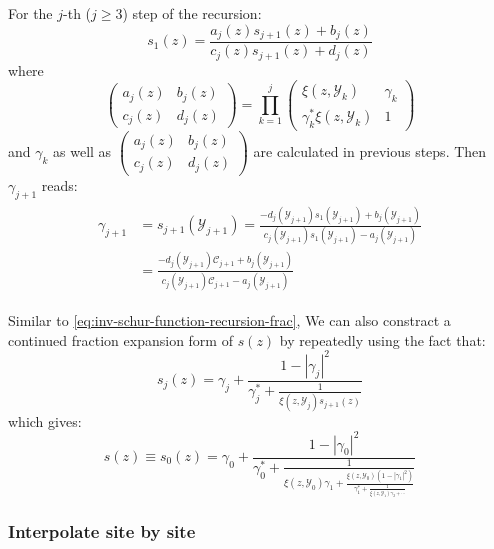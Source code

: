 \documentclass[
	preprint,%
	aps,
	prb,
	showpacs,	
	amsmath, amssymb]{revtex4-2}
\newcommand{\Y}{ {\mathcal{Y}} }
\newcommand{\C}{ {\mathcal{C}} }
\begin{document}
For the $j$-th ($j \geq 3$) step of the recursion:
\begin{equation}
	s_1(z) 
	= \frac{a_j(z) s_{j+1}(z) + b_j(z)}{c_j(z) s_{j+1}(z) + d_j(z)}
\end{equation}
where
\begin{equation}
	\left(
		\begin{matrix}
			a_j(z) & b_j(z) \\
			c_j(z) & d_j(z)
		\end{matrix}
	\right)
	= \prod_{k=1}^{j}
	\left(
		\begin{matrix}
			\xi(z, \Y_k)            & \gamma_k \\
			\gamma_k^* \xi(z, \Y_k) & 1
		\end{matrix}
	\right)
\end{equation}
and $\gamma_k$ as well as $	\left(
	\begin{matrix}
		a_j(z) & b_j(z) \\
		c_j(z) & d_j(z)
	\end{matrix}
\right)$ are calculated in previous steps. 
Then $\gamma_{j+1}$ reads:
\begin{align}\label{eq:explicit-gamma-jp1}
\begin{split}
	\gamma_{j+1} &= s_{j+1}(\Y_{j+1}) 
	= \frac{-d_j(\Y_{j+1}) s_1(\Y_{j+1}) + b_j(\Y_{j+1})} 
		{c_j(\Y_{j+1}) s_1(\Y_{j+1}) - a_j(\Y_{j+1})}\\
	&= \frac{-d_j(\Y_{j+1}) \C_{j+1} + b_j(\Y_{j+1})}
		{c_j(\Y_{j+1}) \C_{j+1} - a_j(\Y_{j+1})}
\end{split}
\end{align}

Similar to \cref{eq:inv-schur-function-recursion-frac},
We can also constract a continued fraction 
expansion form of $s(z)$ by repeatedly using the fact 
that:
\begin{equation}\label{eq:inv-s-s-recursion-frac}
	s_{j}(z) = \gamma_j + \frac{1 - |\gamma_j|^2}
		{\gamma_j^* + \frac{1}{\xi(z,\Y_j) s_{j+1}(z)}}
\end{equation}
which gives:
\begin{equation}\label{eq:s-s-fraction-expansion-fit}
	s(z) \equiv s_0(z) = \gamma_0 + \frac{1 - |\gamma_0|^2}
		{\gamma_0^* + \frac{1}
		{\xi(z,\Y_0)\gamma_1 + \frac{\xi(z,\Y_0) (1 - |\gamma_1|^2)}
		{\gamma_1^* + \frac{1}{\xi(z,\Y_1) \gamma_2 + \cdots}}
		}
		}
\end{equation}


\subsubsection{Interpolate site by site}
\label{subsubsec:interpolate-site-by-site}
\end{document}
